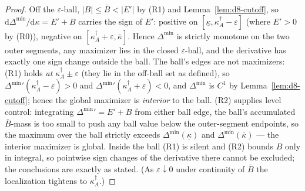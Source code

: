 \begin{proof}
Off the $\varepsilon$-ball, $|B|\le\bar B<|E'|$ by (R1) and Lemma~\ref{lem:d8-cutoff}, so $\mathrm{d}\Delta^{\min}/\mathrm{d}\kappa=E'+B$ carries the sign of $E'$: positive on $[\underline\kappa,\kappa_A^{\dagger}-\varepsilon]$ (where $E'>0$ by (R0)), negative on $[\kappa_A^{\dagger}+\varepsilon,\overline\kappa]$. Hence $\Delta^{\min}$ is strictly monotone on the two outer segments, any maximizer lies in the closed $\varepsilon$-ball, and the derivative has exactly one sign change outside the ball. The ball's edges are not maximizers: (R1) holds \emph{at} $\kappa_A^{\dagger}\pm\varepsilon$ (they lie in the off-ball set as defined), so $\Delta^{\min}{}'(\kappa_A^{\dagger}-\varepsilon)>0$ and $\Delta^{\min}{}'(\kappa_A^{\dagger}+\varepsilon)<0$, and $\Delta^{\min}$ is $C^{1}$ by Lemma~\ref{lem:d8-cutoff}; hence the global maximizer is \emph{interior} to the ball. (R2) supplies level control: integrating $\Delta^{\min}{}'=E'+B$ from either ball edge, the ball's accumulated $\bar B$-mass is too small to push any ball value below the outer-segment endpoints, so the maximum over the ball strictly exceeds $\Delta^{\min}(\underline\kappa)$ and $\Delta^{\min}(\overline\kappa)$ --- the interior maximizer is global. Inside the ball (R1) is silent and (R2) bounds $B$ only in integral, so pointwise sign changes of the derivative there cannot be excluded; the conclusions are exactly as stated. (As $\varepsilon\downarrow0$ under continuity of $\bar B$ the localization tightens to $\kappa_A^{\dagger}$.)
\end{proof}

